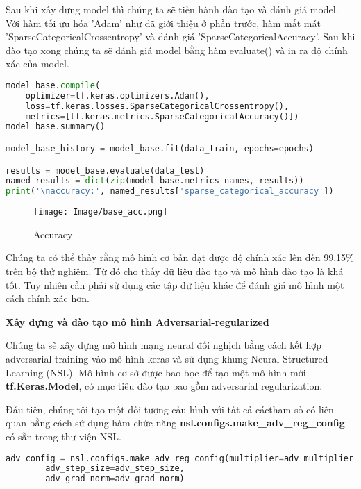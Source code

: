 Sau khi xây dựng model thì chúng ta sẽ tiến hành đào tạo và đánh giá model. Với hàm tối ưu hóa 'Adam' như đã giới thiệu ở phần trước, hàm mất mát 'SparseCategoricalCrossentropy'
và đánh giá 'SparseCategoricalAccuracy'. Sau khi đào tạo xong chúng ta sẽ đánh giá model bằng hàm evaluate() và in ra độ chính xác của model.

\begin{lstlisting}[language=Python]
model_base.compile(
    optimizer=tf.keras.optimizers.Adam(),
    loss=tf.keras.losses.SparseCategoricalCrossentropy(),
    metrics=[tf.keras.metrics.SparseCategoricalAccuracy()])
model_base.summary()

model_base_history = model_base.fit(data_train, epochs=epochs)

results = model_base.evaluate(data_test)
named_results = dict(zip(model_base.metrics_names, results))
print('\naccuracy:', named_results['sparse_categorical_accuracy'])

\end{lstlisting}

\begin{figure}[ht]
\centering
\texttt{[image: Image/base\_acc.png]}
\caption{Accuracy}
\label{fig2.2:Độ chính xác của mô hình cơ bản}
\end{figure}

Chúng ta có thể thấy rằng mô hình cơ bản đạt được độ chính xác lên đến 99,15\% trên bộ thử nghiệm. Từ đó cho thấy dữ liệu đào tạo và 
mô hình đào tạo là khá tốt. Tuy nhiên cần phải sử dụng các tập dữ liệu khác để đánh giá mô hình một cách chính xác hơn.

\textbf{Xây dựng và đào tạo mô hình Adversarial-regularized }

Chúng ta sẽ xây dựng mô hình mạng neural đối nghịch bằng cách kết hợp adversarial training vào mô hình keras và sử dụng khung Neural Structured Learning (NSL).
Mô hình cơ sở được bao bọc để tạo một mô hình mới \textbf{tf.Keras.Model}, có mục tiêu đào tạo bao gồm adversarial regularization.

Đầu tiên, chúng tôi tạo một đối tượng cấu hình với tất cả cáctham số có liên quan bằng cách sử dụng hàm chức năng \textbf{nsl.configs.make\_adv\_reg\_config} có sẵn trong thư viện NSL.

\begin{lstlisting}[language=Python]
    adv_config = nsl.configs.make_adv_reg_config(multiplier=adv_multiplier, 
        adv_step_size=adv_step_size, 
        adv_grad_norm=adv_grad_norm)
\end{lstlisting}

